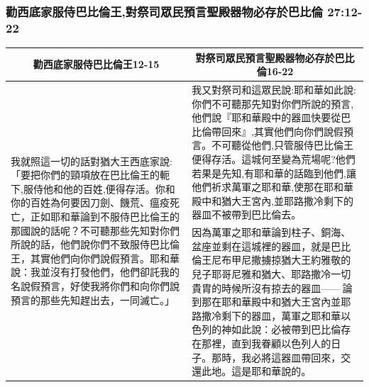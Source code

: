 

\subsubsection{勸西底家服侍巴比倫王,對祭司眾民預言聖殿器物必存於巴比倫 27:12-22}
\begin{table}[H]
\centering
\begin{tabular}{p{}|p{11.50cm}}\hline\hline
\multicolumn{1}{c|}{勸西底家服侍巴比倫王12-15}&\multicolumn{1}{c}{對祭司眾民預言聖殿器物必存於巴比倫16-22}\\\hline
\multirow{2}{6.2cm}{我就照這一切的話對猶大王西底家說:「要把你們的頸項放在巴比倫王的軛下,服侍他和他的百姓,便得存活。你和你的百姓為何要因刀劍、饑荒、瘟疫死亡，正如耶和華論到不服侍巴比倫王的那國說的話呢？不可聽那些先知對你們所說的話，他們說你們不致服侍巴比倫王，其實他們向你們說假預言。耶和華說：我並沒有打發他們，他們卻託我的名說假預言，好使我將你們和向你們說預言的那些先知趕出去，一同滅亡。」}
&我又對祭司和這眾民說:耶和華如此說:你們不可聽那先知對你們所說的預言,他們說『耶和華殿中的器皿快要從巴比倫帶回來』,其實他們向你們說假預言。不可聽從他們,只管服侍巴比倫王便得存活。這城何至變為荒場呢?他們若果是先知,有耶和華的話臨到他們,讓他們祈求萬軍之耶和華,使那在耶和華殿中和猶大王宮內,並耶路撒冷剩下的器皿不被帶到巴比倫去。\\\cline{2-2} 
&因為萬軍之耶和華論到柱子、銅海、盆座並剩在這城裡的器皿，就是巴比倫王尼布甲尼撒擄掠猶大王約雅敬的兒子耶哥尼雅和猶大、耶路撒冷一切貴胄的時候所沒有掠去的器皿—— 論到那在耶和華殿中和猶大王宮內並耶路撒冷剩下的器皿，萬軍之耶和華以色列的神如此說：必被帶到巴比倫存在那裡，直到我眷顧以色列人的日子。那時，我必將這器皿帶回來，交還此地。這是耶和華說的。\\\hline
\end{tabular}
\end{table}





